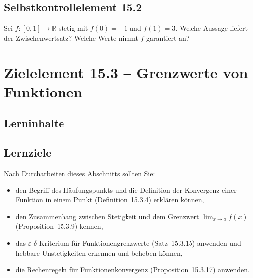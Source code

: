 \documentclass[a4paper,12pt]{article}
\begin{document}
\subsection*{Selbstkontrollelement 15.2}

Sei $f: [0,1] \to \mathbb{R}$ stetig mit $f(0) = -1$ und $f(1) = 3$. Welche Aussage
liefert der Zwischenwertsatz? Welche Werte nimmt $f$ garantiert an?

\newpage

\section*{Zielelement 15.3 -- Grenzwerte von Funktionen}

\subsection*{Lerninhalte}

\begin{center}
\end{center}

\subsection*{Lernziele}

Nach Durcharbeiten dieses Abschnitts sollten Sie:
\begin{itemize}
  \item den Begriff des Häufungspunkts und die Definition der Konvergenz einer
        Funktion in einem Punkt (Definition~15.3.4) erklären können,
  \item den Zusammenhang zwischen Stetigkeit und dem Grenzwert $\lim_{x\to a}f(x)$
        (Proposition~15.3.9) kennen,
  \item das $\varepsilon$-$\delta$-Kriterium für Funktionengrenzwerte (Satz~15.3.15)
        anwenden und hebbare Unstetigkeiten erkennen und beheben können,
  \item die Rechenregeln für Funktionenkonvergenz (Proposition~15.3.17) anwenden.
\end{itemize}
\end{document}
